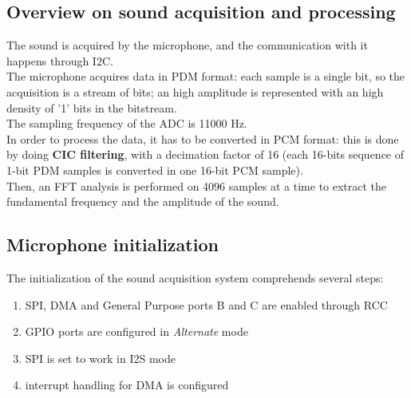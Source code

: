 \subsection{Overview on sound acquisition and processing}
The sound is acquired by the microphone, and the communication with it happens through I2C.\\
The microphone acquires data in PDM format: each sample is a single bit, so the acquisition is a stream of bits; an high amplitude is represented with an high density of '1' bits in the bitstream. \\
The sampling frequency of the ADC is 11000 Hz. \\
In order to process the data, it has to be converted in PCM format: this is done by doing \textbf{CIC filtering}, with a decimation factor of 16 (each 16-bits sequence of 1-bit PDM samples is converted in one 16-bit PCM sample).\\
Then, an FFT analysis is performed on 4096 samples at a time to extract the fundamental frequency and the amplitude of the sound.

\subsection{Microphone initialization}
The initialization of the sound acquisition system comprehends several steps:
\begin{enumerate}
	\item SPI, DMA and General Purpose ports B and C are enabled through RCC
	\item GPIO ports are configured in \textit{Alternate} mode
	\item SPI is set to work in I2S mode
	\item interrupt handling for DMA is configured
	
\end{enumerate}

